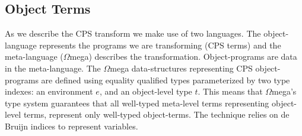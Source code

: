 \documentclass[10pt]{article}
\newcommand{\Varid}[1]{\mathit{#1}}
\newcommand{\Wmega}{\ensuremath{\Omega}mega}
\newcommand{\hide}[1]{}
\begin{document}
\hide{
This allows us to substitute run-time checks for static checks
when necessary. We will make use of this important ability
several places in the sequel, and we will be sure and
point this out when we do.
}


\subsection{Object Terms}

As we describe the CPS transform we make use of two languages.
The object-language represents the programs we are
transforming (CPS terms) and the meta-language (\Wmega{}) describes
the transformation. Object-programs are data in the meta-language.
The \Wmega{} data-structures representing CPS object-programs
are defined using equality qualified types parameterized by two type indexes:
an environment \ensuremath{\Varid{e}}, and an object-level type \ensuremath{\Varid{t}}.  This means that 
\Wmega{}'s type system guarantees that all well-typed
meta-level terms representing object-level terms, represent only well-typed
object-terms.  The technique relies on de Bruijn indices to represent variables.
\cite{Pasalic}
\end{document}
